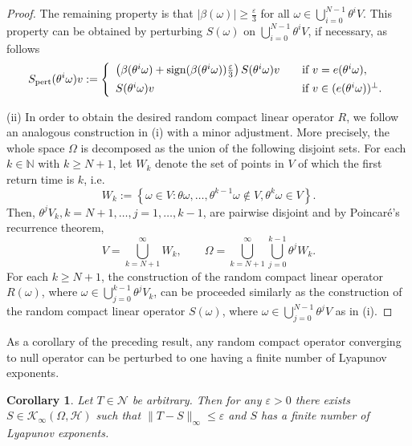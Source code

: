 \documentclass[pdflatex,sn-mathphys-num]{sn-jnl}%
\theoremstyle{thmstyleone}%
\theoremstyle{thmstyletwo}%
\newtheorem{corollary}{Corollary}
\theoremstyle{thmstylethree}%
\newcommand{\N}{\mathbb{N}}
\newcommand{\cH}{\mathcal{H}}
\newcommand{\cK}{\mathcal{K}}
\newcommand{\eps}{\varepsilon}
\numberwithin{equation}{section}
\begin{document}
\begin{proof}
The remaining property is that $|\beta(\omega)|\geq \frac{\eps}{3}$ for all $\omega\in \bigcup_{i=0}^{N-1}\theta^i V$.  This property can be obtained by perturbing $S(\omega)$ on $\bigcup_{i=0}^{N-1}\theta^i V$, if necessary, as follows 
\begin{equation*}
S_{\mathrm{pert}}(\theta^i\omega) v:=
\left\{
\begin{array}{ll}
     \left(\beta(\theta^i\omega)+ \mbox{sign}( \beta(\theta^i\omega))\frac{\eps}{3}\right)S(\theta^i\omega) v &\quad 
     \hbox{if } v=e(\theta^i\omega),\\[1ex]
     S(\theta^i\omega) v &\quad \hbox{if } v\in (e(\theta^i\omega))^{\perp}.
     \end{array}   
\right.
\end{equation*}



(ii) In order to obtain the desired random compact linear operator $R$, we follow an analogous construction in (i) with a minor adjustment. More precisely,  the whole space $\Omega$ is decomposed as the union of the following disjoint sets. For each $k\in\N$ with $k\geq N+1$,  let $W_k$ denote the set of points in $V$ of which the first return time is $k$, i.e. \begin{equation*}
W_k:=\left\{
\omega\in V: \theta\omega,\dots,\theta^{k-1}\omega\not\in V, \theta^k\omega\in V
\right\}.
\end{equation*}
Then, $\theta^j V_k, k=N+1,\dots, j=1,\dots,k-1$, are pairwise disjoint and by Poincar\'{e}'s recurrence theorem, 
\begin{equation*}
V=\bigcup_{k=N+1}^{\infty}W_k,\qquad \Omega=\bigcup_{k=N+1}^{\infty}\bigcup_{j=0}^{k-1}\theta^j W_k.
\end{equation*}
For each $k\geq N+1$, the construction of the random compact linear operator $R(\omega)$, where $\omega\in \bigcup_{j=0}^{k-1}\theta^j V_k$, can be proceeded similarly as the construction of the random compact linear operator $S(\omega)$, where  $\omega\in \bigcup_{j=0}^{N-1}\theta^j V$ as in (i). 
\end{proof}
%
%
As a corollary of the preceding result, any random compact operator converging to null operator can be perturbed to one having a finite number of Lyapunov exponents. 
%
\begin{corollary}\label{Corollary_1}
Let $T\in \mathcal N$ be arbitrary. Then for any $\eps>0$ there exists 
$S\in \cK_{\infty}(\Omega,\cH)$ such that $\|T-S\|_{\infty}\leq \eps$ and $S$ has a finite number of Lyapunov exponents.
\end{corollary}
\end{document}
